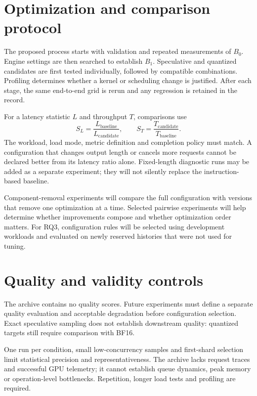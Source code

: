 \section{Optimization and comparison protocol}
The proposed process starts with validation and repeated measurements of $B_0$. Engine settings are then searched to establish $B_1$. Speculative and quantized candidates are first tested individually, followed by compatible combinations. Profiling determines whether a kernel or scheduling change is justified. After each stage, the same end-to-end grid is rerun and any regression is retained in the record.

For a latency statistic $L$ and throughput $T$, comparisons use
\begin{equation}
S_L=\frac{L_{\mathrm{baseline}}}{L_{\mathrm{candidate}}},\qquad
S_T=\frac{T_{\mathrm{candidate}}}{T_{\mathrm{baseline}}}.
\end{equation}
The workload, load mode, metric definition and completion policy must match. A configuration that changes output length or cancels more requests cannot be declared better from its latency ratio alone. Fixed-length diagnostic runs may be added as a separate experiment; they will not silently replace the instruction-based baseline.

Component-removal experiments will compare the full configuration with versions that remove one optimization at a time. Selected pairwise experiments will help determine whether improvements compose and whether optimization order matters. For RQ3, configuration rules will be selected using development workloads and evaluated on newly reserved histories that were not used for tuning.


\section{Quality and validity controls}
The archive contains no quality scores. Future experiments must define a separate quality evaluation and acceptable degradation before configuration selection. Exact speculative sampling does not establish downstream quality: quantized targets still require comparison with BF16.


One run per condition, small low-concurrency samples and first-shard selection limit statistical precision and representativeness. The archive lacks request traces and successful GPU telemetry; it cannot establish queue dynamics, peak memory or operation-level bottlenecks. Repetition, longer load tests and profiling are required.
